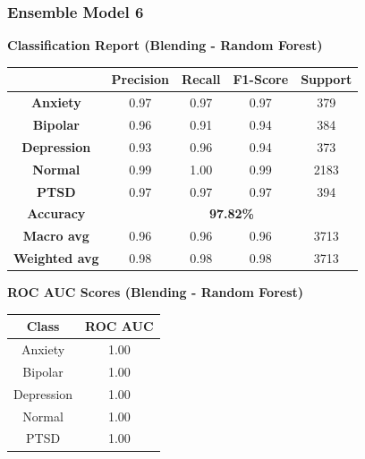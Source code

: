 \pagebreak

\subsubsection{Ensemble Model 6}

\begin{center}
    \textbf{Classification Report (Blending - Random Forest)} \\[0.5em]
    \begin{tabular}{|c|c|c|c|c|}
        \hline
        & \textbf{Precision} & \textbf{Recall} & \textbf{F1-Score} & \textbf{Support} \\ \hline
        \textbf{Anxiety}    & 0.97 & 0.97 & 0.97 & 379 \\ \hline
        \textbf{Bipolar}    & 0.96 & 0.91 & 0.94 & 384 \\ \hline
        \textbf{Depression} & 0.93 & 0.96 & 0.94 & 373 \\ \hline
        \textbf{Normal}     & 0.99 & 1.00 & 0.99 & 2183 \\ \hline
        \textbf{PTSD}       & 0.97 & 0.97 & 0.97 & 394 \\ \hline
        \textbf{Accuracy}   & \multicolumn{4}{c|}{\textbf{97.82\%}} \\ \hline
        \textbf{Macro avg}  & 0.96 & 0.96 & 0.96 & 3713 \\ \hline
        \textbf{Weighted avg} & 0.98 & 0.98 & 0.98 & 3713 \\ \hline
    \end{tabular}
\end{center}


\begin{center}
    \textbf{ROC AUC Scores (Blending - Random Forest)} \\[0.5em]
    \begin{tabular}{|c|c|}
        \hline
        \textbf{Class} & \textbf{ROC AUC} \\ \hline
        Anxiety & 1.00 \\ \hline
        Bipolar & 1.00 \\ \hline
        Depression & 1.00 \\ \hline
        Normal & 1.00 \\ \hline
        PTSD & 1.00 \\ \hline
    \end{tabular}
\end{center}

